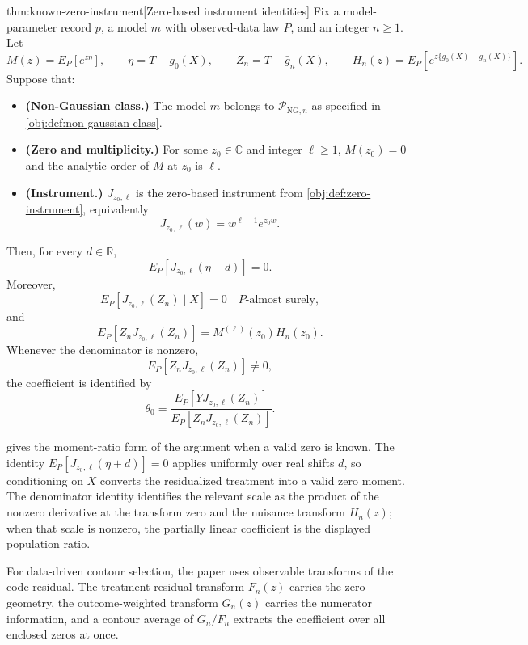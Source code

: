 \begin{theoremv}{thm:known-zero-instrument}[Zero-based instrument identities]
Fix a model-parameter record \(p\), a model \(m\) with observed-data law \(P\), and an integer \(n\ge 1\). Let
\[
M(z)=E_P\!\left[e^{z\eta}\right],
\qquad
\eta=T-g_0(X),
\qquad
Z_n=T-\bar g_n(X),
\qquad
H_n(z)=E_P\!\left[e^{z\{g_0(X)-\bar g_n(X)\}}\right].
\]
Suppose that:
\begin{itemize}
\item \textbf{(Non-Gaussian class.)} The model \(m\) belongs to \(\mathcal P_{\mathrm{NG},n}\) as specified in \cref{obj:def:non-gaussian-class}.
\item \textbf{(Zero and multiplicity.)} For some \(z_0\in\mathbb C\) and integer \(\ell\ge 1\), \(M(z_0)=0\) and the analytic order of \(M\) at \(z_0\) is \(\ell\).
\item \textbf{(Instrument.)} \(J_{z_0,\ell}\) is the zero-based instrument from \cref{obj:def:zero-instrument}, equivalently
\[
J_{z_0,\ell}(w)=w^{\ell-1}e^{z_0w}.
\]
\end{itemize}
Then, for every \(d\in\mathbb R\),
\[
E_P\!\left[J_{z_0,\ell}(\eta+d)\right]=0.
\]
Moreover,
\[
E_P\!\left[J_{z_0,\ell}(Z_n)\mid X\right]=0
\quad P\text{-almost surely},
\]
and
\[
E_P\!\left[Z_n J_{z_0,\ell}(Z_n)\right]
=
M^{(\ell)}(z_0)H_n(z_0).
\]
Whenever the denominator is nonzero,
\[
E_P\!\left[Z_nJ_{z_0,\ell}(Z_n)\right]\neq 0,
\]
the coefficient is identified by
\[
\theta_0
=
\frac{E_P\!\left[YJ_{z_0,\ell}(Z_n)\right]}
     {E_P\!\left[Z_nJ_{z_0,\ell}(Z_n)\right]}.
\]
\end{theoremv}

 gives the moment-ratio form of the argument when a valid zero is known. The identity \(E_P[J_{z_0,\ell}(\eta+d)]=0\) applies uniformly over real shifts \(d\), so conditioning on \(X\) converts the residualized treatment into a valid zero moment. The denominator identity identifies the relevant scale as the product of the nonzero derivative at the transform zero and the nuisance transform \(H_n(z)\); when that scale is nonzero, the partially linear coefficient is the displayed population ratio.

For data-driven contour selection, the paper uses observable transforms of the code residual. The treatment-residual transform \(F_n(z)\) carries the zero geometry, the outcome-weighted transform \(G_n(z)\) carries the numerator information, and a contour average of \(G_n/F_n\) extracts the coefficient over all enclosed zeros at once.

